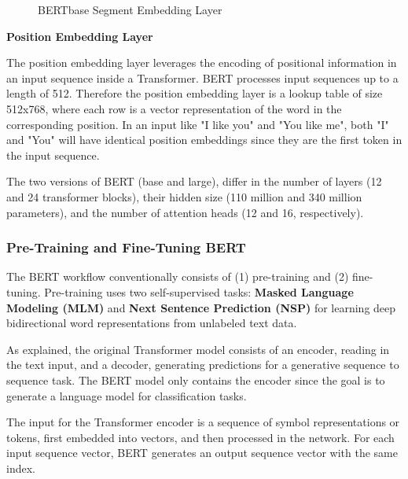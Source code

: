 \begin{figure}
{
    }
    \caption{BERTbase Segment Embedding Layer}
    \label{fig:BERT_segmentEmbedding}
\end{figure}


\textbf{Position Embedding Layer}

The position embedding layer leverages the encoding of positional information in an input sequence inside a Transformer. BERT processes input sequences up to a length of 512. Therefore the position embedding layer is a lookup table of size 512x768, where each row is a vector representation of the word in the corresponding position. In an input like "I like you" and "You like me", both "I" and "You" will have identical position embeddings since they are the first token in the input sequence. 

The two versions of BERT (base and large), differ in the number of layers (12 and 24 transformer blocks), their hidden size (110 million and 340 million parameters), and the number of attention heads (12 and 16, respectively).

\subsubsection{Pre-Training and Fine-Tuning BERT}
\label{sec:bert_pre-fine}
The BERT workflow conventionally consists of (1) pre-training and (2) fine-tuning. Pre-training uses two self-supervised tasks: \textbf{Masked Language Modeling (MLM)} and \textbf{Next Sentence Prediction (NSP)} for learning deep bidirectional word representations from unlabeled text data.

As explained, the original Transformer model consists of an encoder, reading in the text input, and a decoder, generating predictions for a generative sequence to sequence task. The BERT model only contains the encoder since the goal is to generate a language model for classification tasks.

The input for the Transformer encoder is a sequence of symbol representations or tokens, first embedded into vectors, and then processed in the network. For each input sequence vector, BERT generates an output sequence vector with the same index.

